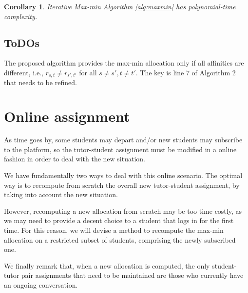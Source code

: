 \documentclass[11pt,oneside,a4paper]{article}     %
\newtheorem{corollary}{Corollary}
\begin{document}
\begin{corollary}
Iterative Max-min Algorithm \ref{alg:maxmin} has polynomial-time complexity.
\end{corollary}



\subsection{ToDOs}

The proposed algorithm provides the max-min allocation only if all affinities are different, i.e., $r_{s,t}\ne r_{s',t'}$ for all $s\ne s',t\ne t'$. The key is line 7 of Algorithm 2 that needs to be refined.

\section{Online assignment}

As time goes by, some students may depart and/or new students may subscribe to the platform, so the tutor-student assignment must be modified in a online fashion in order to deal with the new situation.

We have fundamentally two ways to deal with this online scenario.
The optimal way is to recompute from scratch the overall new tutor-student assignment, by taking into account the new situation. 

However, recomputing a new allocation from scratch may be too time costly, as we may need to provide a decent choice to a student that logs in for the first time. For this reason, we will devise a method to recompute the max-min allocation on a restricted subset of students, comprising the newly subscribed one.

We finally remark that, when a new allocation is computed, the only student-tutor pair assignments that need to be maintained are those who currently have an ongoing conversation.






\end{document}
